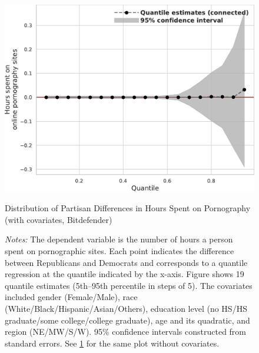 \documentclass[12pt,twoside]{article}
\begin{document}
\begin{figure}[ht]
	\centering
	\includegraphics[width=.6\linewidth]{figs/bitdefender_quantile_reg_covariates_duration_adult.pdf}
	\caption{Distribution of Partisan Differences in Hours Spent on Pornography (with covariates, Bitdefender)}
	\caption*{\footnotesize \emph{Notes:} 
		The dependent variable is the number of hours a person spent on pornographic sites.
		Each point indicates the difference between Republicans and Democrats and corresponds to a quantile regression at the quantile indicated by the x-axis.
  Figure shows 19 quantile estimates (5th--95th percentile in steps of 5).
		The covariates included gender (Female/Male), race (White/Black/Hispanic/Asian/Others), education level (no HS/HS graduate/some college/college graduate), age and its quadratic, and region (NE/MW/S/W).
		95\% confidence intervals constructed from standard errors.
		See \cref{fig:bitdefender_quantile_regression_duration_covariates} for the same plot without covariates.
	}
	\label{fig:bitdefender_quantile_regression_duration_covariates}
\end{figure}


\FloatBarrier
\clearpage
\end{document}
